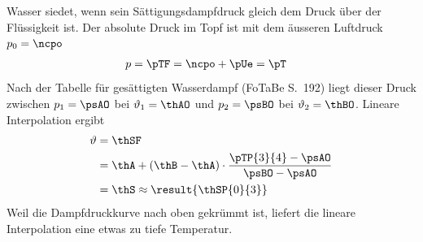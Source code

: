 Wasser siedet, wenn sein Sättigungsdampfdruck gleich dem Druck über der Flüssigkeit ist. Der absolute Druck im Topf ist mit dem äusseren Luftdruck $p_0 = \ncpo$
\begin{align}
 p &= \pTF = \ncpo + \pUe = \pT
\end{align}
Nach der Tabelle für gesättigten Wasserdampf (FoTaBe S.~192) liegt dieser Druck zwischen $p_1 = \psAO$ bei $\vartheta_1 = \thAO$ und $p_2 = \psBO$ bei $\vartheta_2 = \thBO$. Lineare Interpolation ergibt
\begin{align}
 \vartheta &= \thSF \\
   &= \thA + \left(\thB-\thA\right)\cdot\frac{\pTP{3}{4}-\psAO}{\psBO-\psAO} \\
   &= \thS \approx \result{\thSP{0}{3}}
\end{align}
Weil die Dampfdruckkurve nach oben gekrümmt ist, liefert die lineare Interpolation eine etwas zu tiefe Temperatur.

